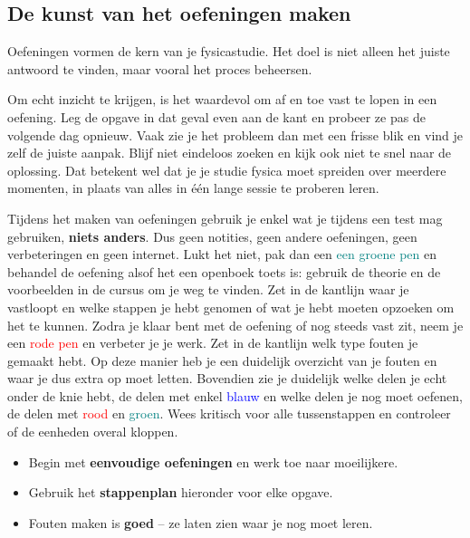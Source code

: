 \documentclass{ximera}
\begin{document}

\subsection{De kunst van het oefeningen maken}

Oefeningen vormen de kern van je fysicastudie.
Het doel is niet alleen het juiste antwoord te vinden, maar vooral het proces beheersen.


Om echt inzicht te krijgen, is het waardevol om af en toe vast te lopen in een oefening.
Leg de opgave in dat geval even aan de kant en probeer ze pas de volgende dag opnieuw.
Vaak zie je het probleem dan met een frisse blik en vind je zelf de juiste aanpak.
Blijf niet eindeloos zoeken en kijk ook niet te snel naar de oplossing.
Dat betekent wel dat je je studie fysica moet spreiden over meerdere momenten,
in plaats van alles in één lange sessie te proberen leren.


Tijdens het maken van oefeningen gebruik je enkel wat je tijdens een test mag gebruiken, \textbf{niets anders}.
Dus geen notities, geen andere oefeningen, geen verbeteringen en geen internet.
\newline
Lukt het niet, pak dan een \textcolor{teal}{een groene pen} en behandel de oefening alsof het een openboek toets is: gebruik de theorie en de voorbeelden in de cursus om je weg te vinden.
Zet in de kantlijn waar je vastloopt en welke stappen je hebt genomen of wat je hebt moeten opzoeken om het te kunnen.
\newline
Zodra je klaar bent met de oefening of nog steeds vast zit, neem je een \textcolor{red}{rode pen} en verbeter je je werk. Zet in de kantlijn welk type fouten je gemaakt hebt.
Op deze manier heb je een duidelijk overzicht van je fouten en waar je dus extra op moet letten.
Bovendien zie je duidelijk welke delen je echt onder de knie hebt, de delen met enkel \textcolor{blue}{blauw} en welke delen je nog moet oefenen, de delen met \textcolor{red}{rood} en \textcolor{teal}{groen}.
Wees kritisch voor alle tussenstappen en controleer of de eenheden overal kloppen.



\begin{itemize}
    \item Begin met \textbf{eenvoudige oefeningen} en werk toe naar moeilijkere.
    \item Gebruik het \textbf{stappenplan} hieronder voor elke opgave.
    \item Fouten maken is \textbf{goed} – ze laten zien waar je nog moet leren.
\end{itemize}
\end{document}
